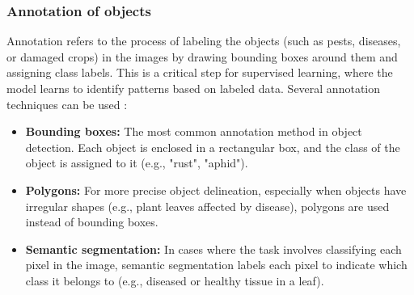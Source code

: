 \subsubsection{Annotation of objects}
Annotation refers to the process of labeling the objects (such as pests, diseases, or damaged crops) in the images by drawing bounding boxes around them and assigning class labels. This is a critical step for supervised learning, where the model learns to identify patterns based on labeled data. Several annotation techniques can be used \parencite{zhao2019objectdetection}:
\begin{itemize}
    \item \textbf{Bounding boxes:} The most common annotation method in object detection. Each object is enclosed in a rectangular box, and the class of the object is assigned to it (e.g., "rust", "aphid").
    \item \textbf{Polygons:} For more precise object delineation, especially when objects have irregular shapes (e.g., plant leaves affected by disease), polygons are used instead of bounding boxes.
    \item \textbf{Semantic segmentation:} In cases where the task involves classifying each pixel in the image, semantic segmentation labels each pixel to indicate which class it belongs to (e.g., diseased or healthy tissue in a leaf).
\end{itemize}



    
    
